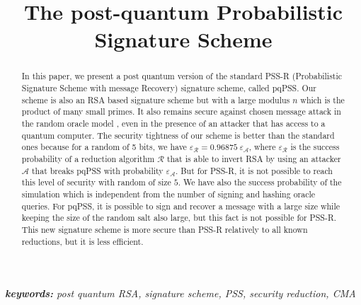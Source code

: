 \documentclass[a4paper,11pt]{article}
\begin{document}
\title{The post-quantum Probabilistic Signature Scheme}
\maketitle
\begin{abstract}
In this paper, we present a post quantum version of the standard PSS-R (Probabilistic Signature Scheme with message Recovery) signature scheme, called pqPSS. Our scheme is also an RSA based signature scheme but with a large modulus $n$ which is the product of many small primes. It also remains secure against chosen message attack in the random oracle model , even in the presence of an attacker that has access to a quantum computer. The security tightness of our scheme is better than the standard ones because for a random of 5 bits, we have $\varepsilon_{\mathcal{R}}=0.96875 \ \varepsilon_{\mathcal{A}}$, where $\varepsilon_{\mathcal{R}}$  is the success probability of a reduction algorithm $\mathcal{R}$ that is able to invert RSA by using an attacker $\mathcal{A}$ that breaks pqPSS with probability $\varepsilon_{\mathcal{A}}$. But for PSS-R, it is not possible to reach this level of security with random of size $5$. We have also the success probability of the simulation which is independent from the number of signing and hashing oracle queries. For pqPSS, it is possible to sign and recover a message with a large size while keeping the size of the random salt also large, but this fact is not possible for PSS-R. This new signature scheme is more secure than PSS-R relatively to all known reductions, but it is less efficient.
\end{abstract}
{\it \textbf{keywords:} post quantum RSA, signature scheme, PSS, security reduction, CMA}
\end{document}
